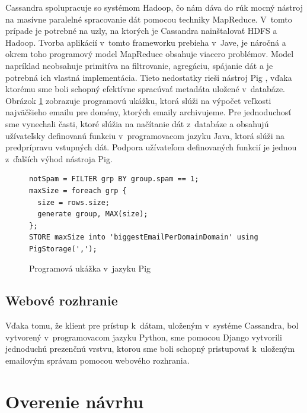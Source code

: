 \documentclass[11pt,twoside,a4paper]{book}
\begin{document}
Cassandra spolupracuje so systémom Hadoop, čo nám dáva do rúk mocný nástroj na masívne paralelné spracovanie dát pomocou techniky MapReduce. V~tomto prípade je potrebné na uzly, na ktorých je Cassandra nainštalovať HDFS a Hadoop. Tvorba aplikácií v~tomto frameworku prebieha v~Jave, je náročná a okrem toho programový model MapReduce obsahuje viacero problémov. Model napríklad neobsahuje primitíva na filtrovanie, agregáciu, spájanie dát a je potrebná ich vlastná implementácia. Tieto nedostatky rieši nástroj Pig \cite{olston2008pig}, vďaka ktorému sme boli schopný efektívne spracúvať metadáta uložené v~databáze. Obrázok \ref{fig:PigExample} zobrazuje programovú ukážku, ktorá slúži na výpočet veľkosti najväčšieho emailu pre domény, ktorých emaily archivujeme. Pre jednoduchosť sme vynechali časti, ktoré slúžia na načítanie dát z~databáze a obsahujú užívateľsky definovanú funkciu v~programovacom jazyku Java, ktorá slúži na predprípravu vstupných dát. Podpora užívateľom definovaných funkcií je jednou z~ďalších výhod nástroja Pig.

\begin{figure}[h]
\begin{verbatim}
notSpam = FILTER grp BY group.spam == 1;
maxSize = foreach grp {
  size = rows.size;
  generate group, MAX(size);
};
STORE maxSize into 'biggestEmailPerDomainDomain' using PigStorage(',');
\end{verbatim}
 \caption{Programová ukážka v~jazyku Pig}
 \label{fig:PigExample}
\end{figure}  



\subsection{Webové rozhranie}
Vďaka tomu, že klient pre prístup k~dátam, uloženým v~systéme Cassandra, bol vytvorený v~programovacom jazyku Python, sme pomocou Django vytvorili jednoduchú prezenčnú vrstvu, ktorou sme boli schopný pristupovať k~uloženým emailovým správam pomocou webového rozhrania.


\section{Overenie návrhu}
\end{document}
